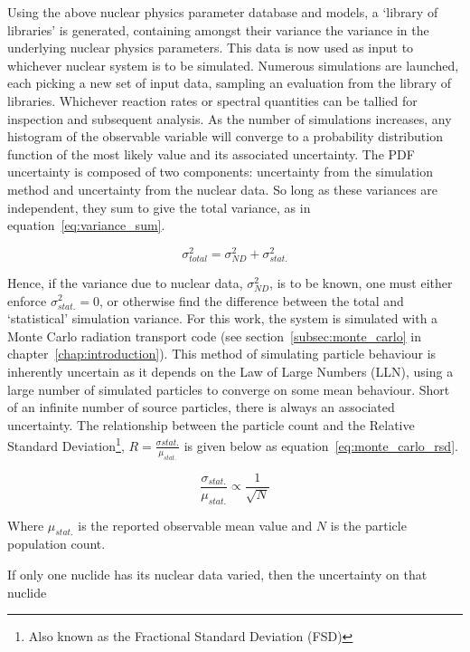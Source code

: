 Using the above nuclear physics parameter database and models, a `library of libraries' is generated, containing amongst their variance the variance in the underlying nuclear physics parameters. This data is now used as input to whichever nuclear system is to be simulated. Numerous simulations are launched, each picking a new set of input data, sampling an evaluation from the library of libraries. Whichever reaction rates or spectral quantities can be tallied for inspection and subsequent analysis. As the number of simulations increases, any histogram of the observable variable will converge to a probability distribution function of the most likely value and its associated uncertainty. The PDF uncertainty is composed of two components: uncertainty from the simulation method and uncertainty from the nuclear data. So long as these variances are independent, they sum to give the total variance, as in equation~\ref{eq:variance_sum}. 

\begin{equation}
  \label{eq:variance_sum}
  \sigma_{total}^{2} = \sigma_{ND}^{2} + \sigma_{stat.}^{2}
\end{equation}

Hence, if the variance due to nuclear data, $\sigma_{ND}^{2}$, is to be known, one must either enforce $\sigma_{stat.}^{2} = 0$, or otherwise find the difference between the total and `statistical' simulation variance. For this work, the system is simulated with a Monte Carlo radiation transport code (see section~\ref{subsec:monte_carlo} in chapter~\ref{chap:introduction}). This method of simulating particle behaviour is inherently uncertain as it depends on the Law of Large Numbers (LLN), using a large number of simulated particles to converge on some mean behaviour. Short of an infinite number of source particles, there is always an associated uncertainty. The relationship between the particle count and the Relative Standard Deviation\footnote{Also known as the Fractional Standard Deviation (FSD)}, $R = \frac{\sigma{stat.}}{\mu_{stat.}}$ is given below as equation~\ref{eq:monte_carlo_rsd}.

\begin{equation}
  \label{eq:monte_carlo_rsd}
  \frac{\sigma_{stat.}}{\mu_{stat.}} \propto \frac{1}{\sqrt{N}}
\end{equation}

Where $\mu_{stat.}$ is the reported observable mean value and $N$ is the particle population count.

If only one nuclide has its nuclear data varied, then the uncertainty on that nuclide 

